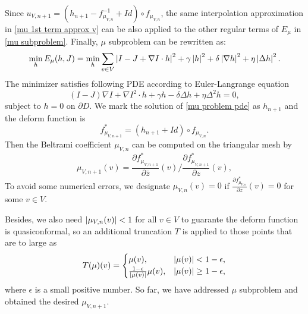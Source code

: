 \documentclass[review,onefignum,onetabnum]{siamonline190516}
\begin{document}
Since $u_{V,n+1} = (h_{n+1} - f_{\mu_{V,n}}^{-1} + Id) \circ f_{\mu_{V,n}}$, the same interpolation approximation in \ref{mu 1st term approx v} can be also applied to the other regular terms of $E_\mu$ in \ref{mu subproblem}. Finally, $\mu$ subproblem can be rewritten as:
\begin{equation}
    \min_h E_\mu (h, J)
    = \min_h \sum_{v \in V} \left\vert I - J + \nabla I \cdot h \right\vert^2 
    + \gamma \left\vert h \right\vert^2
    + \delta \left\vert \nabla h \right\vert^2 
    + \eta \left\vert \Delta h \right\vert^2.
\end{equation}
The minimizer satisfies following PDE according to Euler-Langrange equation
\begin{equation}\label{mu problem pde}
    (I-J) \nabla I + \nabla I^2 \cdot h + \gamma h - \delta \Delta h + \eta \Delta^2 h = 0,
\end{equation}
subject to $h = 0$ on $\partial D$. We mark the solution of \ref{mu problem pde} as $h_{n+1}$ and the deform function is
\begin{equation}\label{mu deform function f}
    f^*_{\mu_{V,n+1}} = (h_{n+1} + Id) \circ f_{\mu_{V,n}}.
\end{equation}
Then the Beltrami coefficient $\mu_{V,n}$ can be computed on the triangular mesh by
\begin{equation}\label{mu mu}
    \mu_{V,n+1}(v) = \frac{\partial f^*_{\mu_{V,n+1}}}{\partial \bar{z}}(v) \bigg / \frac{\partial f^*_{\mu_{V,n+1}}}{\partial z}(v),
\end{equation}
To avoid some numerical errors, we designate $\mu_{V,n}(v) = 0$ if $\frac{\partial f^*_{\mu_{V,n}}}{\partial z}(v) = 0$ for some $v \in V$.

Besides, we also need $\left\vert \mu_{V,n}(v) \right\vert < 1$ for all $v \in V$ to guarante the deform function is quasiconformal, so an additional truncation $T$ is applied to those points that are to large as
\begin{equation}\label{mu truncate}
    T(\mu)(v) = \begin{cases}
        \mu(v),                                  & \abs{\mu(v)} < 1 - \epsilon,    \\
        \frac{1 - \epsilon}{\abs{\mu(v)}}\mu(v), & \abs{\mu(v)} \ge 1 - \epsilon,
    \end{cases}
\end{equation}
where $\epsilon$ is a small positive number. So far, we have addressed $\mu$ subproblem and obtained the desired $\mu_{V,n+1}$.
\end{document}
